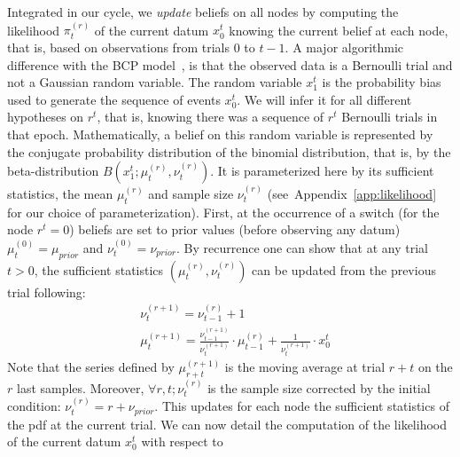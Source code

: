 \documentclass[12pt,english]{article}%
\newcommand{\eqa}[1]{\begin{align}#1\end{align}}
\newcommand{\citep}[1]{\parencite{#1}}
\newcommand{\seeFig}[1]{Figure~\ref{fig:#1}}
\newcommand{\seeEq}[1]{Equation~\ref{eq:#1}}
\newcommand{\seeApp}[1]{Appendix~\ref{app:#1}}
\begin{document}
Integrated in our cycle, we \emph{update} beliefs on all nodes
by computing the likelihood $\pi^{(r)}_t$ of the current datum $x_0^{t}$
knowing the current belief at each node,
that is, based on observations from trials $0$ to $t-1$. %
A major algorithmic difference with the BCP model~\citep{AdamsMackay2007},
is that the observed data is a Bernoulli trial and not a Gaussian random variable.
The random variable $x_1^t$ is the probability bias used
to generate the sequence of events $x_0^t$.
We will infer it for all different hypotheses on $r^t$,
that is, knowing there was a sequence of $r^t$ Bernoulli trials in that epoch.
Mathematically, a belief on this random variable is represented
by the conjugate probability distribution of the binomial distribution,
that is, by the beta-distribution $B(x_1^t; \mu^{(r)}_{t}, \nu^{(r)}_{t})$.
It is parameterized here by its sufficient statistics,
the mean $\mu^{(r)}_{t}$ and sample size $\nu^{(r)}_{t}$ %
(see~\seeApp{likelihood} for our choice of parameterization).
First, at the occurrence of a switch (for the node $r^t=0$)
beliefs are set to prior values (before observing any datum)
$\mu^{(0)}_{t} = \mu_{prior}$ and $\nu^{(0)}_{t} = \nu_{prior}$.
By recurrence %
one can show that at any trial $t>0$,
the sufficient statistics $(\mu^{(r)}_{t}, \nu^{(r)}_{t})$
can be updated from the previous trial following:
\eqa{
& \nu^{(r+1)}_{t} = \nu^{(r)}_{t-1} + 1 \\
& \mu^{(r+1)}_{t} = \frac{\nu^{(r+1)}_{t-1}}{\nu^{(r+1)}_{t}} \cdot \mu^{(r)}_{t-1} + \frac{1}{\nu^{(r+1)}_{t}} \cdot x_0^{t}
}
Note that the series defined by $\mu^{(r+1)}_{r+t}$ is the moving average at trial $r+t$ on the $r$ last samples.
Moreover, $\forall r, t; \nu^{(r)}_{t}$ is the sample size corrected by the initial condition:
$\nu^{(r)}_{t} = r + \nu_{prior}$.
This updates for each node the sufficient statistics of the pdf at the current trial.
We can now detail the computation of the likelihood of the current datum $x_0^{t}$ with respect to
\end{document}
